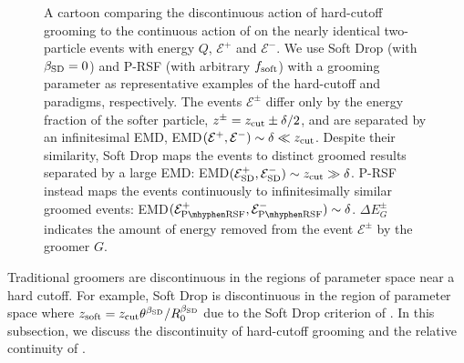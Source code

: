\begin{figure}[]
\centering
\scalebox{0.95}{
    
}
\caption[A cartoon comparing the discontinuous action of hard-cutoff grooming to the continuous action of \PIRANHA{}.]{
A cartoon comparing the discontinuous action of hard-cutoff grooming to the continuous action of \PIRANHA{} on the nearly identical two-particle events with energy \(Q\), \(\mathcal{E}^+\) and \(\mathcal{E}^-\).
%
We use Soft Drop (with \(\beta_{\rm SD} = 0\)) and P-RSF (with arbitrary \(f_{\rm soft}\)) with a grooming parameter \zcut{} as representative examples of the hard-cutoff and \PIRANHA{} paradigms, respectively.
The events \(\mathcal E^\pm\) differ only by the energy fraction of the softer particle,
%
\(
z^\pm = z_{\rm cut} \pm \delta/2
\),
%
and are separated by an infinitesimal EMD,
%
EMD\(
(\mathcal{E}^+, \mathcal{E}^-)
\sim \delta \ll z_{\rm cut}
\).
Despite their similarity, Soft Drop maps the events to distinct groomed results separated by a large EMD:
%
%
%
EMD\(
(\mathcal{E}_{\rm SD}^+, \mathcal{E}_{\rm SD}^-)
\sim z_{\rm cut} \gg \delta
\).
P-RSF instead
maps the events continuously to infinitesimally similar groomed events:
%
EMD\(
(\mathcal{E}_{\rm P\mhyphen RSF}^+,
\mathcal{E}_{\rm P\mhyphen RSF}^-)
\sim \delta
\).
%
\(\Delta E^\pm_G\) indicates the amount of energy removed from the event \(\mathcal E^\pm\) by the groomer \(G\).
}
\label{fig:grooming-cartoon}
\end{figure}


Traditional groomers are discontinuous in the regions of parameter space near a hard cutoff.
%
For example, Soft Drop is discontinuous in the region of parameter space where
\(
    z_{\rm soft} = z_{\rm cut} \theta^{\beta_{\rm SD}} / R_0^{\beta_{\rm SD}}
\)
due to the Soft Drop criterion of .
%
In this subsection, we discuss the discontinuity of hard-cutoff grooming and the relative continuity of \PIRANHA{}.

